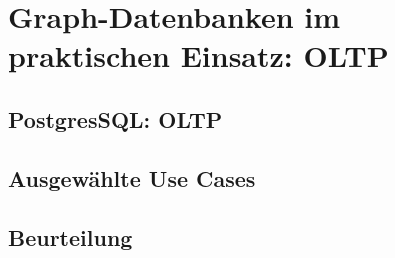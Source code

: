\chapter{Graph-Datenbanken im praktischen Einsatz: OLTP}
\section{PostgresSQL: OLTP}
\section{Ausgewählte Use Cases}
\section{Beurteilung}